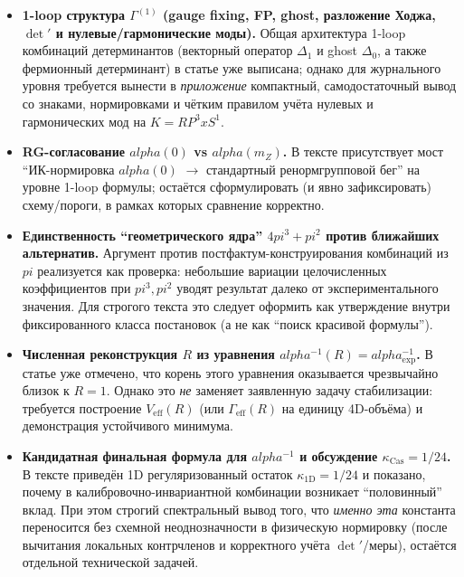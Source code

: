 \documentclass[12pt]{article}
\def\mathbb#1{#1}%
\def\alpha{alpha}%
\def\pi{pi}%
\def\times{x}%
\begin{document}
\begin{itemize}
  \item \textbf{1-loop структура $\Gamma^{(1)}$ (gauge fixing, FP, ghost, разложение Ходжа, $\det'$ и нулевые/гармонические моды).}
  Общая архитектура 1-loop комбинаций детерминантов (векторный оператор $\Delta_1$ и ghost $\Delta_0$, а также фермионный детерминант) в статье уже выписана; однако для журнального уровня требуется вынести в \emph{приложение} компактный, самодостаточный вывод со знаками, нормировками и чётким правилом учёта нулевых и гармонических мод на $K=\mathbb{RP}^3\times S^1$.

  \item \textbf{RG-согласование $\alpha(0)$ vs $\alpha(m_Z)$.}
  В тексте присутствует мост ``ИК-нормировка $\alpha(0)$ $\to$ стандартный ренормгрупповой бег'' на уровне 1-loop формулы; остаётся сформулировать (и явно зафиксировать) схему/пороги, в рамках которых сравнение корректно.

  \item \textbf{Единственность ``геометрического ядра'' $4\pi^3+\pi^2$ против ближайших альтернатив.}
  Аргумент против постфактум-конструирования комбинаций из $\pi$ реализуется как проверка: небольшие вариации целочисленных коэффициентов при $\pi^3,\pi^2$ уводят результат далеко от экспериментального значения.
  Для строгого текста это следует оформить как утверждение внутри фиксированного класса постановок (а не как ``поиск красивой формулы'').

  \item \textbf{Численная реконструкция $R$ из уравнения $\alpha^{-1}(R)=\alpha^{-1}_{\mathrm{exp}}$.}
  В статье уже отмечено, что корень этого уравнения оказывается чрезвычайно близок к $R=1$.
  Однако это \emph{не} заменяет заявленную задачу стабилизации: требуется построение $V_{\mathrm{eff}}(R)$ (или $\Gamma_{\mathrm{eff}}(R)$ на единицу 4D-объёма) и демонстрация устойчивого минимума.

  \item \textbf{Кандидатная финальная формула для $\alpha^{-1}$ и обсуждение $\kappa_{\mathrm{Cas}}=1/24$.}
  В тексте приведён 1D регуляризованный остаток $\kappa_{\mathrm{1D}}=1/24$ и показано, почему в калибровочно-инвариантной комбинации возникает ``половинный'' вклад.
  При этом строгий спектральный вывод того, что \emph{именно эта} константа переносится без схемной неоднозначности в физическую нормировку (после вычитания локальных контрчленов и корректного учёта $\det'$/меры), остаётся отдельной технической задачей.


\end{itemize}
\end{document}
